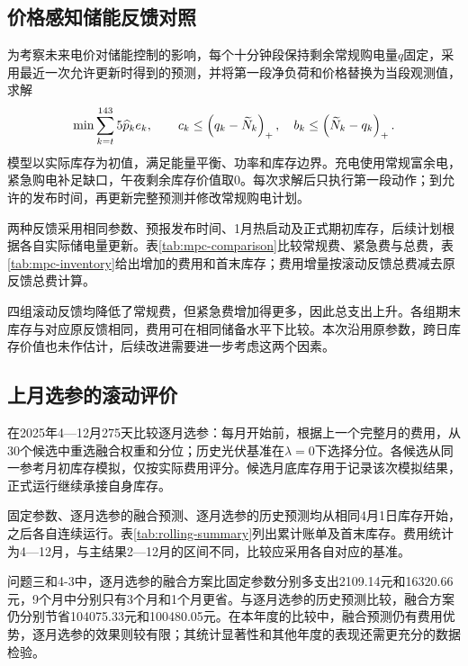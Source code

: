 \subsection{价格感知储能反馈对照}\label{sec:feedback}
为考察未来电价对储能控制的影响，每个十分钟段保持剩余常规购电量$q$固定，采用最近一次允许更新时得到的预测，并将第一段净负荷和价格替换为当段观测值，求解
\begin{equation}
 \min\sum_{k=t}^{143}5\widehat p_k e_k,\qquad
 c_k\le\left(q_k-\widetilde N_k\right)_{+},\quad b_k\le\left(\widetilde N_k-q_k\right)_{+}.
\end{equation}
模型以实际库存为初值，满足能量平衡、功率和库存边界。充电使用常规富余电，紧急购电补足缺口，午夜剩余库存价值取0。每次求解后只执行第一段动作；到允许的发布时间，再更新完整预测并修改常规购电计划。

两种反馈采用相同参数、预报发布时间、1月热启动及正式期初库存，后续计划根据各自实际储电量更新。表\ref{tab:mpc-comparison}比较常规费、紧急费与总费，表\ref{tab:mpc-inventory}给出增加的费用和首末库存；费用增量按滚动反馈总费减去原反馈总费计算。


\FloatBarrier
四组滚动反馈均降低了常规费，但紧急费增加得更多，因此总支出上升。各组期末库存与对应原反馈相同，费用可在相同储备水平下比较。本次沿用原参数，跨日库存价值也未作估计，后续改进需要进一步考虑这两个因素。

\subsection{上月选参的滚动评价}\label{sec:rolling}
在2025年4—12月275天比较逐月选参：每月开始前，根据上一个完整月的费用，从30个候选中重选融合权重和分位；历史光伏基准在$\lambda=0$下选择分位。各候选从同一参考月初库存模拟，仅按实际费用评分。候选月底库存用于记录该次模拟结果，正式运行继续承接自身库存。

固定参数、逐月选参的融合预测、逐月选参的历史预测均从相同4月1日库存开始，之后各自连续运行。表\ref{tab:rolling-summary}列出累计账单及首末库存。费用统计为4—12月，与主结果2—12月的区间不同，比较应采用各自对应的基准。

\FloatBarrier
问题三和4-3中，逐月选参的融合方案比固定参数分别多支出2109.14元和16320.66元，9个月中分别只有3个月和1个月更省。与逐月选参的历史预测比较，融合方案仍分别节省104075.33元和100480.05元。在本年度的比较中，融合预测仍有费用优势，逐月选参的效果则较有限；其统计显著性和其他年度的表现还需更充分的数据检验。
